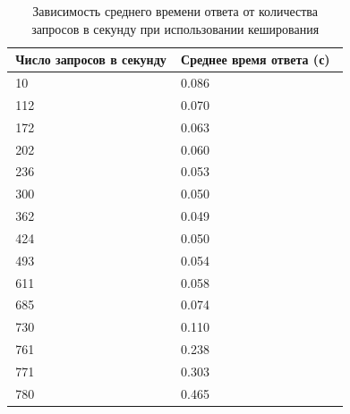 \begin{table}[H]
\centering
\caption{Зависимость среднего времени ответа от количества запросов в секунду при использовании кеширования}
\begin{tabular}{|m{6.85cm}|m{9.25cm}|}
\hline
    \,\hfill \textbf{Число запросов в секунду} & \,\hfill \textbf{Среднее время ответа (с)} \hfill\, \\ \hline
    \,\hfill  10 \hfill\, & \,\hfill 0.086 \hfill\, \\ \hline
    \,\hfill 112 \hfill\, & \,\hfill 0.070 \hfill\, \\ \hline
    \,\hfill 172 \hfill\, & \,\hfill 0.063 \hfill\, \\ \hline
    \,\hfill 202 \hfill\, & \,\hfill 0.060 \hfill\, \\ \hline
    \,\hfill 236 \hfill\, & \,\hfill 0.053 \hfill\, \\ \hline
    \,\hfill 300 \hfill\, & \,\hfill 0.050 \hfill\, \\ \hline
    \,\hfill 362 \hfill\, & \,\hfill 0.049 \hfill\, \\ \hline
    \,\hfill 424 \hfill\, & \,\hfill 0.050 \hfill\, \\ \hline
    \,\hfill 493 \hfill\, & \,\hfill 0.054 \hfill\, \\ \hline
    \,\hfill 611 \hfill\, & \,\hfill 0.058 \hfill\, \\ \hline
    \,\hfill 685 \hfill\, & \,\hfill 0.074 \hfill\, \\ \hline
    \,\hfill 730 \hfill\, & \,\hfill 0.110 \hfill\, \\ \hline
    \,\hfill 761 \hfill\, & \,\hfill 0.238 \hfill\, \\ \hline
    \,\hfill 771 \hfill\, & \,\hfill 0.303 \hfill\, \\ \hline
    \,\hfill 780 \hfill\, & \,\hfill 0.465 \hfill\, \\ \hline
\end{tabular}
\label{tab:cache:avg}
\end{table}


